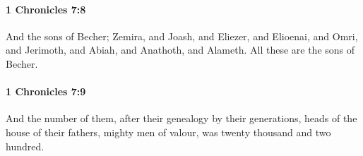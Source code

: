 		\paragraph{1 Chronicles 7:8} %
			\label{1CHRONICLES-7-8}

			And the sons of Becher; Zemira, and Joash, and Eliezer, and Elioenai, and Omri, and Jerimoth, and Abiah, and Anathoth, and Alameth. All these are the sons of Becher.


		\paragraph{1 Chronicles 7:9} %
			\label{1CHRONICLES-7-9}

			And the number of them, after their genealogy by their generations, heads of the house of their fathers, mighty men of valour, was twenty thousand and two hundred.


